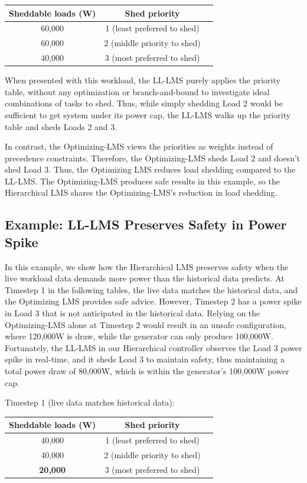 \documentclass{acm_proc_article-sp}
\begin{document}
\begin{tabular}{c|cc}
Sheddable loads (W) & Shed priority \\ \hline
60,000 & 1 (least preferred to shed) \\
60,000 & 2 (middle priority to shed) \\ 
40,000 & 3 (most preferred to shed) \\ \hline
\end{tabular}

When presented with this workload, the LL-LMS purely applies the priority table, without any optimization or branch-and-bound to investigate ideal combinations of tasks to shed. 
Thus, while simply shedding Load 2 would be sufficient to get system under its power cap, the LL-LMS walks up the priority table and sheds Loads 2 and 3.

In contrast, the Optimizing-LMS views the priorities as weights instead of precedence constraints. 
Therefore, the Optimizing-LMS sheds Load 2 and doesn't shed Load 3. 
Thus, the Optimizing LMS reduces load shedding compared to the LL-LMS.
The Optimizing-LMS produces safe results in this example, so the Hierarchical LMS shares the Optimizing-LMS's reduction in load shedding.

\subsection{Example: LL-LMS Preserves Safety in Power Spike}
\label{sec:power-spike-example}
In this example, we show how the Hierarchical LMS preserves safety when the live workload data demands more power than the historical data predicts. 
At Timestep 1 in the following tables, the live data matches the historical data, and the Optimizing LMS provides safe advice.
However, Timestep 2 has a power spike in Load 3 that is not anticipated in the historical data. 
Relying on the Optimizing-LMS alone at Timestep 2 would result in an unsafe configuration, where 120,000W is draw, while the generator can only produce 100,000W.
Fortunately, the LL-LMS in our Hierarchical controller observes the Load 3 power spike in real-time, and it sheds Load 3 to maintain safety, thus maintaining a total power draw of 80,000W, which is within the generator's 100,000W power cap.

Timestep 1 (live data matches historical data):\\
\begin{tabular}{c|cc}
Sheddable loads (W) & Shed priority \\ \hline
40,000 & 1 (least preferred to shed) \\
40,000 & 2 (middle priority to shed) \\ 
{\bf 20,000} & 3 (most preferred to shed) \\ \hline
\end{tabular}
\end{document}
